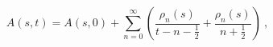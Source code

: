 \begin{equation}
A(s,t)=A(s,0)+
\sum_{n=0}^\infty
\left(
\frac{\rho_n(s)}{t-n-\frac{1}{2}}+\frac{\rho_n(s)}{n+\frac{1}{2}}
\right)\ ,
\label{6}
\end{equation}

